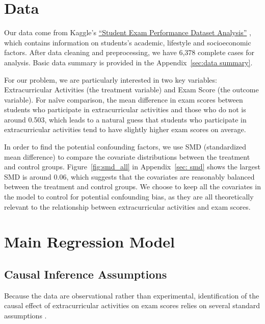 \documentclass[10pt,letterpaper]{article}
\begin{document}
\section{Data}

Our data come from Kaggle's \href{https://www.kaggle.com/datasets/grandmaster07/student-exam-performance-dataset-analysis/data}{ ``Student Exam Performance Dataset Analysis''} \cite{kaggle_student_performance}, which contains information on students's academic, lifestyle and socioeconomic factors. After data cleaning and preprocessing, we have 6,378 complete cases for analysis. Basic data summary is provided in the Appendix~\ref{sec:data summary}.

For our problem, we are particularly interested in two key variables: Extracurricular Activities (the treatment variable) and Exam Score (the outcome variable). For naîve comparison, the mean difference in exam scores between students who participate in extracurricular activities and those who do not is around 0.503, which leads to a natural guess that students who participate in extracurricular activities tend to have slightly higher exam scores on average. 

In order to find the potential confounding factors, we use SMD (standardized mean difference) to compare the covariate distributions between the treatment and control groups. Figure~\ref{fig:smd_all} in Appendix~\ref{sec: smd} shows the largest SMD is around 0.06, which suggests that the covariates are reasonably balanced between the treatment and control groups. We choose to keep all the covariates in the model to control for potential confounding bias, as they are all theoretically relevant to the relationship between extracurricular activities and exam scores.

\section{Main Regression Model}

\subsection{Causal Inference Assumptions}

Because the data are observational rather than experimental, identification of the causal effect of extracurricular activities on exam scores relies on several standard assumptions \cite{ding_first_2023}.
\end{document}
